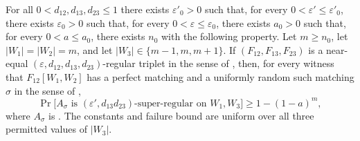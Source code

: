 \begin{lemma}
For all $0<d_{12},d_{13},d_{23}\leq1$ there exists $\varepsilon'_0>0$ such that, for every $0<\varepsilon'\leq\varepsilon'_0$, there exists $\varepsilon_0>0$ such that, for every $0<\varepsilon\leq\varepsilon_0$, there exists $a_0>0$ such that, for every $0<a\leq a_0$, there exists $n_0$ with the following property.  Let $m\geq n_0$, let $|W_1|=|W_2|=m$, and let $|W_3|\in\{m-1,m,m+1\}$.  If $(F_{12},F_{13},F_{23})$ is a near-equal $(\varepsilon,d_{12},d_{13},d_{23})$-regular triplet in the sense of , then, for every witness that $F_{12}[W_1,W_2]$ has a perfect matching and a uniformly random such matching $\sigma$ in the sense of ,
\[
 \Pr\bigl[A_\sigma\text{ is }(\varepsilon',d_{13}d_{23})\text{-super-regular on }W_1,W_3\bigr]
 \geq1-(1-a)^m,
\]
where $A_\sigma$ is .  The constants and failure bound are uniform over all three permitted values of $|W_3|$.
\end{lemma}
